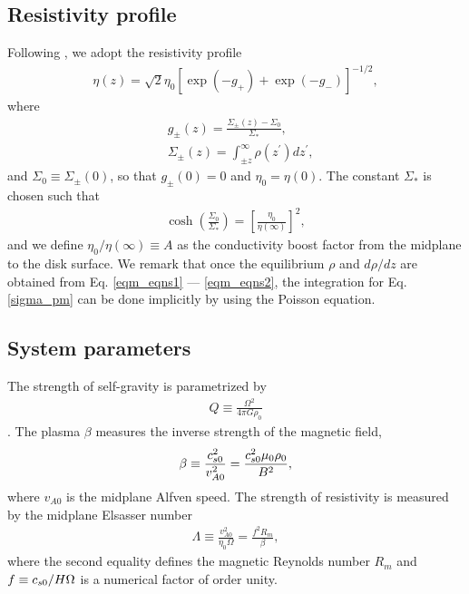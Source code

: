 \subsection{Resistivity profile}
Following \cite{fleming03}, we adopt the resistivity profile
\begin{align}
  \eta(z) =
  \sqrt{2}\eta_0\left[\exp{\left(-g_+\right)}+\exp{\left(-g_-\right)}\right]^{-1/2},  
\end{align}
where
\begin{align}
  &g_\pm(z) =  \frac{\Sigma_\pm(z)-\Sigma_0}{\Sigma_*}, \\
  &\Sigma_\pm(z) = \int_{\pm z}^\infty\rho(z^\prime)dz^\prime, \label{sigma_pm}
\end{align}
and $\Sigma_0\equiv\Sigma_{\pm}(0)$, so that $g_\pm(0)=0$ and $\eta_0 
= \eta(0)$. The constant $\Sigma_*$ is chosen such that 
\begin{align}
  \cosh{\left(\frac{\Sigma_0}{\Sigma_*}\right)} =
  \left[\frac{\eta_0}{\eta(\infty)}\right]^2,
\end{align}
and we define $\eta_0/\eta(\infty)\equiv A$ as the conductivity
boost factor from the midplane to the disk surface. We remark that
once the equilibrium $\rho$ and $d\rho/dz$ are obtained from
Eq. \ref{eqm_eqns1} --- \ref{eqm_eqns2}, the integration for
Eq. \ref{sigma_pm} can be done implicitly by using the Poisson
equation. 


\subsection{System parameters}
The strength of self-gravity is parametrized by
\begin{align}
  Q \equiv \frac{\Omega^2}{4\pi G\rho_0}
\end{align}
\citep{mamat10}. The plasma $\beta$ measures the inverse strength of
the magnetic field,
\begin{align}
  \beta \equiv \frac{c_{s0}^2}{v_{A0}^2} =
  \frac{c_{s0}^2\mu_0\rho_0}{B^2},  
\end{align}
where $v_{A0}$ is the midplane Alfven speed. The strength of
resistivity is measured by the midplane Elsasser number 
\begin{align}
  \Lambda \equiv \frac{v_{A0}^2}{\eta_0\Omega} = \frac{f^2 R_m}{\beta}, 
\end{align}
where the second equality defines the magnetic Reynolds number $R_m$
and $f\equiv c_{s0}/H\Omega$ is a numerical factor of order unity.  



